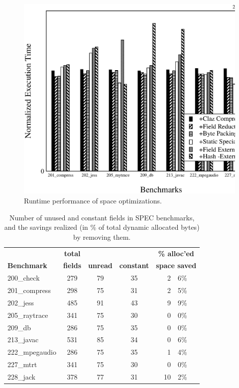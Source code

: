 \documentclass[preprint]{acmconf}
\begin{document}
\begin{figure}
\includegraphics[scale=0.32,clip=true]{Figures/oopsla-speed.eps}
\caption{Runtime performance of space optimizations.}
\label{fig:space}
\end{figure}

\begin{table}
\begin{tabular}{lcccr@{.}l}
&\bf total&&&\multicolumn{2}{c}{\bf\% alloc'ed}\\
\bf Benchmark &\bf fields &\bf unread &\bf constant &
\multicolumn{2}{c}{\bf space saved} \\\hline
200\_check      & 279 &   79   &   35   &  2&6\% \\
201\_compress   & 298 &   75   &   31   &  2&5\% \\
202\_jess       & 485 &   91   &   43   &  9&9\% \\
205\_raytrace   & 341 &   75   &   30   &  0&0\% \\
209\_db         & 286 &   75   &   35   &  0&0\% \\
213\_javac      & 531 &   85   &   34   &  0&6\% \\
222\_mpegaudio  & 286 &   75   &   35   &  1&4\% \\
227\_mtrt       & 341 &   75   &   30   &  0&0\% \\
228\_jack       & 378 &   77   &   31   & 10&2\% \\
\end{tabular}
\caption{Number of unused and constant fields in SPEC benchmarks,
  and the savings realized (in \% of total dynamic allocated bytes) by
  removing them.}
\label{tab:const-unused}
\end{table}
\end{document}
